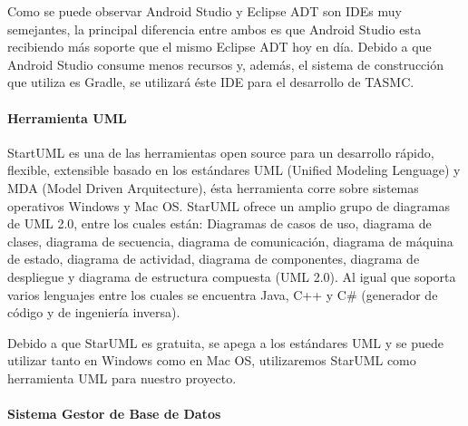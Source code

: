 Como se puede observar Android Studio y Eclipse ADT son IDEs muy semejantes, la principal diferencia entre ambos es que Android Studio esta recibiendo más soporte que el mismo Eclipse ADT hoy en día. Debido a que Android Studio consume menos recursos y, además, el sistema de construcción que utiliza es Gradle, se utilizará éste IDE para el desarrollo de TASMC.

\paragraph{Herramienta UML}

StartUML es una de las herramientas open source para un desarrollo rápido, flexible, extensible basado en los estándares UML (Unified Modeling Lenguage) y MDA (Model Driven Arquitecture), ésta herramienta corre sobre sistemas operativos Windows y Mac OS. StarUML ofrece un amplio grupo de diagramas de UML 2.0, entre los cuales están: Diagramas de casos de uso, diagrama de clases, diagrama de secuencia, diagrama de comunicación, diagrama de máquina de estado, diagrama de actividad, diagrama de componentes, diagrama de despliegue y diagrama de estructura compuesta (UML 2.0). Al igual que soporta varios lenguajes entre los cuales se encuentra Java, C++ y C\# (generador de código y de ingeniería inversa). \cite{starUML}

Debido a que StarUML es gratuita, se apega a los estándares UML y se puede utilizar tanto en Windows como en Mac OS, utilizaremos StarUML como herramienta UML para nuestro proyecto.
\newpage
\paragraph{Sistema Gestor de Base de Datos}

